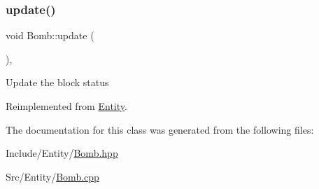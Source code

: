 \mbox{\label{class_bomb_a15851182c209713a5946f977a7fb24b8}} 
\subsubsection{\texorpdfstring{update()}{update()}}
{\footnotesize\ttfamily void Bomb\+::update (\begin{DoxyParamCaption}{ }\end{DoxyParamCaption})\hspace{0.3cm}{\ttfamily [override]}, {\ttfamily [virtual]}}

Update the block status 

Reimplemented from \mbox{\hyperlink{class_entity_a00b6eeaf99b35c8f8b10b5fbfc1baf4f}{Entity}}.



The documentation for this class was generated from the following files\+:\begin{DoxyCompactItemize}
\item 
Include/\+Entity/\mbox{\hyperlink{_bomb_8hpp}{Bomb.\+hpp}}\item 
Src/\+Entity/\mbox{\hyperlink{_bomb_8cpp}{Bomb.\+cpp}}\end{DoxyCompactItemize}
